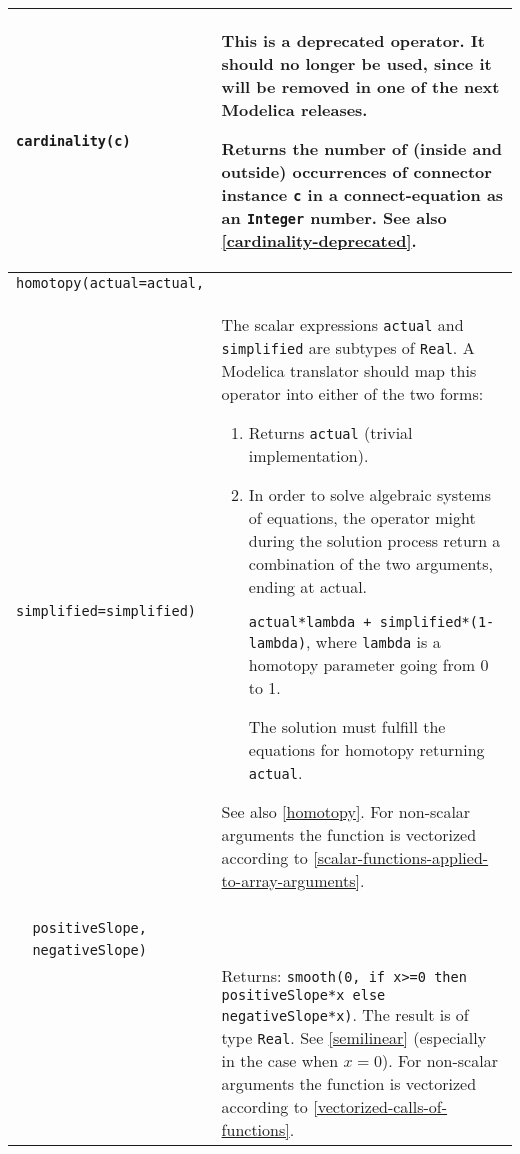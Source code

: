 \begin{longtable}{|p{5.1cm}|p{8cm}|}
\lstinline!cardinality(c)! &
\begin{nonnormative*}
This is a deprecated operator. It should no longer be used, since it will be removed in one of the next Modelica releases.
\end{nonnormative*}

Returns the number of (inside and outside) occurrences of connector
instance \lstinline!c! in a connect-equation as an \lstinline!Integer! number. See also \autoref{cardinality-deprecated}.\\
\hline

\lstinline!homotopy(actual=actual,!\\
\lstinline!   simplified=simplified)! & The scalar expressions \lstinline!actual! and \lstinline!simplified! are subtypes of
\lstinline!Real!. A Modelica translator should map this operator into either of the two forms:
\begin{enumerate}
\item
  Returns \lstinline!actual! (trivial implementation).
\item
  In order to solve algebraic systems of equations, the operator might
  during the solution process return a combination of the two arguments,
  ending at actual.
  \begin{example}
  \lstinline!actual*lambda + simplified*(1-lambda)!, where \lstinline!lambda! is a homotopy parameter going from 0 to 1.
  \end{example}
  The solution must fulfill the equations for homotopy returning \lstinline!actual!.
\end{enumerate}

See also \autoref{homotopy}. For non-scalar arguments the function is
vectorized according to \autoref{scalar-functions-applied-to-array-arguments}.\\
\hline

\begin{tabular}{@{}p{5.1cm}@{}}
\lstinline!semiLinear(x,!\\
\lstinline!  positiveSlope,!\\
\lstinline!  negativeSlope)!\\
\end{tabular}&
Returns:
\lstinline!smooth(0, if x>=0 then positiveSlope*x else negativeSlope*x)!.
The result is of type \lstinline!Real!. See \autoref{semilinear} (especially in
the case when $x = 0$). For non-scalar arguments the function is
vectorized according to \autoref{vectorized-calls-of-functions}.\\
\hline


\end{longtable}
